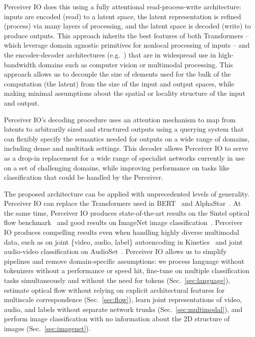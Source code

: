 \documentclass{article} \usepackage{iclr2022_conference,times}
\newcommand{\ourmodel}{Perceiver IO\xspace}
\begin{document}
\ourmodel{} does this using a fully attentional read-process-write architecture: inputs are encoded (read) to a latent space, the latent representation is refined (process) via many layers of processing, and the latent space is decoded (write) to produce outputs. This approach inherits the best features of both Transformers -- which leverage domain agnostic primitives for nonlocal processing of inputs -- and the encoder-decoder architectures (e.g.~\citealt{ronnenberger2015convolutional, newell2016stacked}) that are in widespread use in high-bandwidth domains such as computer vision or multimodal processing. This approach allows us to decouple the size of elements used for the bulk of the computation (the latent) from the size of the input and output spaces, while making minimal assumptions about the spatial or locality structure of the input and output. 

\ourmodel{}'s decoding procedure uses an attention mechanism to map from latents to arbitrarily sized and structured outputs using a querying system that can flexibly specify the semantics needed for outputs on a wide range of domains, including dense and multitask settings. This decoder allows \ourmodel{} to serve as a drop-in replacement for a wide range of specialist networks currently in use on a set of challenging domains, while improving performance on tasks like classification that could be handled by the Perceiver.

The proposed architecture can be applied with unprecedented levels of generality. \ourmodel{} can replace the Transformers used in BERT~\citep{devlin2019bert} and AlphaStar~\citep{vinyals2019grandmaster}. At the same time, \ourmodel{} produces state-of-the-art results on the Sintel optical flow benchmark~\citep{butler2012naturalistic} and good results on ImageNet image classification~\citep{deng2009imagenet}. \ourmodel{} produces compelling results even when handling highly diverse multimodal data, such as on joint \{video, audio, label\} autoencoding in Kinetics~\citep{smaira2020short} and joint audio-video classification on AudioSet~\citep{gemmeke2017audio}. \ourmodel{} allows us to simplify pipelines and remove domain-specific assumptions: we process language without tokenizers without a performance or speed hit, fine-tune on multiple classification tasks simultaneously and without the need for  tokens (Sec.~\ref{sec:language}), estimate optical flow without relying on explicit architectural features for multiscale correspondence (Sec.~\ref{sec:flow}), learn joint representations of video, audio, and labels without separate network trunks (Sec.~\ref{sec:multimodal}), and perform image classification with no information about the 2D structure of images (Sec.~\ref{sec:imagenet}).
\end{document}
